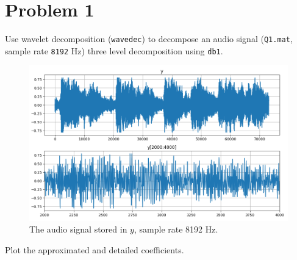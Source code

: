 \section*{Problem 1} \label{sec:problem1}


\begin{tcolorbox}[colback=red!5!white,boxrule=0pt,frame empty]
    Use wavelet decomposition (\verb|wavedec|) to decompose an audio signal (\verb|Q1.mat|, sample rate \verb|8192| Hz)
    three level decomposition using \verb|db1|.
\end{tcolorbox}

\vspace{0.5cm}

\begin{figure}[H]
    \centering
    \includegraphics[width=\textwidth]{./img/Q1.png}
    \caption{The audio signal stored in $y$, sample rate 8192 Hz.}
    \label{fig:Q1}
\end{figure}

\vspace{0.5cm}
 

\begin{tcolorbox}[colback=red!5!white,colframe=red!75!black,title=Problem 1.a]
    Plot the approximated and detailed coefficients.
\end{tcolorbox}


